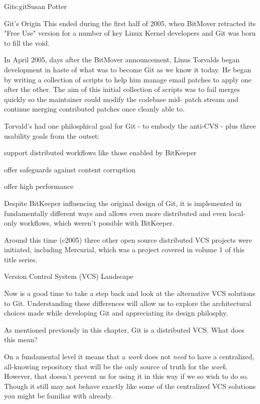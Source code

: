 \begin{aosachapter}{Git}{s:git}{Susan Potter}
\begin{aosasect1}{Git's Origin}
This ended during the first half of 2005, when BitMover retracted its
"Free Use" version for a number of key Linux Kernel developers and Git
was born to fill the void.

In April 2005, days after the BitMover announcement, Linus Torvalds began
development in haste of what was to become Git as we know it today. He began
by writing a collection of scripts to help him manage email patches
to apply one after the other. The aim of this initial collection of scripts
was to fail merges quickly so the maintainer could modify the codebase mid-
patch stream and continue merging contributed patches once cleanly able to.

Torvald's had one philosphical goal for Git - to embody the anti-CVS - plus
three usability goals from the outset:
\begin{aosaitemize}
  \item support distributed workflows like those enabled by BitKeeper
  \item offer safeguards against content corruption
  \item offer high performance
\end{aosaitemize}

Despite BitKeeper influencing the original design of Git, it is implemented
in fundamentally different ways and allows even more distributed and even
local-only workflows, which weren't possible with BitKeeper.

Around this time (c2005) three other open source distributed VCS projects
were initiated, including Mercurial, which was a project covered in volume 1
of this title series.

\end{aosasect1}

\begin{aosasect1}{Version Control System (VCS) Landscape}

Now is a good time to take a step back and look at the alternative VCS
solutions to Git. Understanding these differences will allow us to explore
the architectural choices made while developing Git and appreciating its
design philosphy.

As mentioned previously in this chapter, Git is a distributed VCS. What does
this mean?

On a fundamental level it means that a \emph{work} does not \emph{need} to
have a centralized, all-knowing repository that will be the only source of
truth for the \emph{work}. However, that doesn't prevent us for using it in
this way if we so wish to do so. Though it still may not behave exactly like
some of the centralized VCS solutions you might be familiar with already.


\end{aosasect1}
\end{aosachapter}
